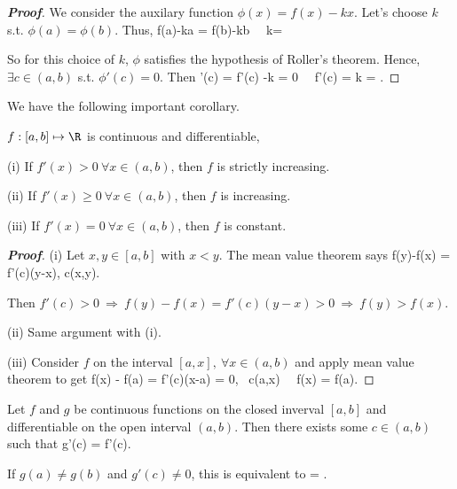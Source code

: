 \begin{proof}[{\bf Proof}]
We consider the auxilary function $\phi(x)=f(x)-kx$. Let's choose $k$ s.t. $\phi(a)=\phi(b)$. Thus,
\be
f(a)-ka = f(b)-kb \ \Rightarrow \ k=
\ee

So for this choice of $k$, $\phi$ satisfies the hypothesis of Roller's theorem. Hence, $\exists c\in (a,b)$ s.t. $\phi'(c)=0$. Then
\be
\phi'(c) = f'(c) -k = 0 \ \Rightarrow \ f'(c) = k = .
\ee
\end{proof}

We have the following important corollary.

\begin{corollary}\label{cor:diff}
$f: [a,b]\mapsto \R$ is continuous and differentiable,
\ben
\item [(i)] If $f'(x)>0 \ \forall x\in (a,b)$, then $f$ is strictly increasing.
\item [(ii)] If $f'(x)\geq 0 \ \forall x\in (a,b)$, then $f$ is increasing.
\item [(iii)] If $f'(x)=0 \ \forall x\in (a,b)$, then $f$ is constant.
\een
\end{corollary}

\begin{proof}[{\bf Proof}]
\ben
\item [(i)] Let $x,y\in[a,b]$ with $x<y$. The mean value theorem says
\be
f(y)-f(x) = f'(c)(y-x), \quad \exists c\in (x,y).
\ee

Then $f'(c)>0 \ \Rightarrow \ f(y)-f(x) = f'(c)(y-x) >0 \ \Rightarrow \ f(y) > f(x)$.

\item [(ii)] Same argument with (i).
\item [(iii)] Consider $f$ on the interval $[a,x],\ \forall x\in(a,b)$ and apply mean value theorem to get
\be
f(x) - f(a) = f'(c)(x-a) = 0, \ \exists c\in (a,x) \ \Rightarrow \ f(x) = f(a).
\ee
\een
\end{proof}

\begin{theorem}\label{thm:mean_value_cauchy}%
Let $f$ and $g$ be continuous functions on the closed inverval $[a,b]$ and differentiable on the open interval $(a,b)$. Then there exists some $c\in (a,b)$ such that
\be
{}g'(c) = f'(c).
\ee

If $g(a)\neq g(b)$ and $g'(c) \neq 0$, this is equivalent to
\be
{} = .
\ee
\end{theorem}

